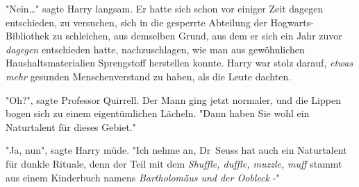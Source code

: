 {"Nein…" sagte Harry langsam. Er hatte sich schon vor einiger Zeit dagegen entschieden, zu versuchen, sich in die gesperrte Abteilung der Hogwarts-Bibliothek zu schleichen, aus demselben Grund, aus dem er sich ein Jahr zuvor \emph{dagegen} entschieden hatte, nachzuschlagen, wie man aus gewöhnlichen Haushaltsmaterialien Sprengstoff herstellen konnte. Harry war stolz darauf, \emph{etwas} \emph{mehr} gesunden Menschenverstand zu haben, als die Leute dachten.

"Oh?", sagte Professor Quirrell. Der Mann ging jetzt normaler, und die Lippen bogen sich zu einem eigentümlichen Lächeln. "Dann haben Sie wohl ein Naturtalent für dieses Gebiet."

"Ja, nun", sagte Harry müde. "Ich nehme an, Dr~Seuss hat auch ein Naturtalent für dunkle Rituale, denn der Teil mit dem \emph{Shuffle, duffle, muzzle,} \emph{muff} stammt aus einem Kinderbuch namens \emph{Bartholomäus und der Oobleck} -"

}
